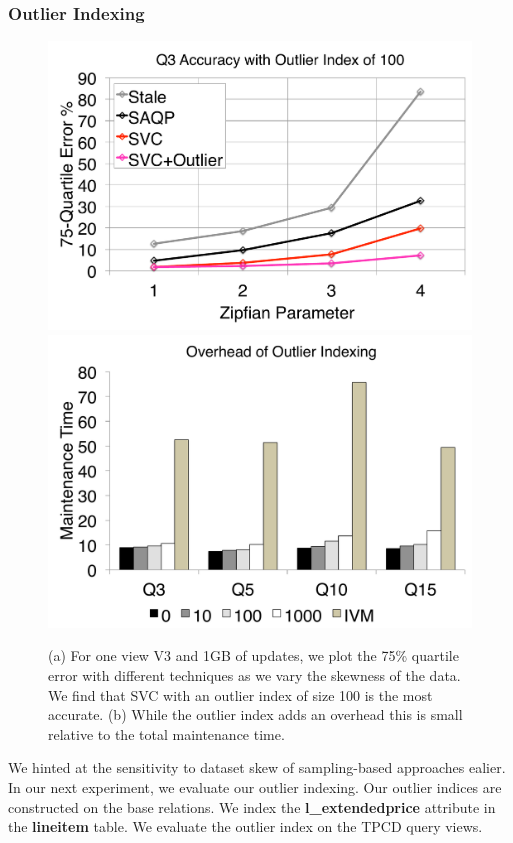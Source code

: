 \subsubsection{Outlier Indexing}

\begin{figure}[t]
\centering
 \includegraphics[scale=0.14]{exp/msoi_1.pdf}
 \includegraphics[scale=0.14]{exp/msoi_2.pdf}

 \caption{(a) For one view V3 and 1GB of updates, we plot the 75\% quartile error with different techniques as we vary the skewness of the data. We find that SVC with an outlier index of size 100 is the most accurate.  (b) While the outlier index adds an overhead this is small relative to the total maintenance time. \label{exp5-oi} }
\end{figure}
We hinted at the sensitivity to dataset skew of sampling-based approaches ealier.
In our next experiment, we evaluate our outlier indexing.
Our outlier indices are constructed on the base relations.
We index the \textbf{l\_extendedprice} attribute in the \textbf{lineitem} table.
We evaluate the outlier index on the TPCD query views.

